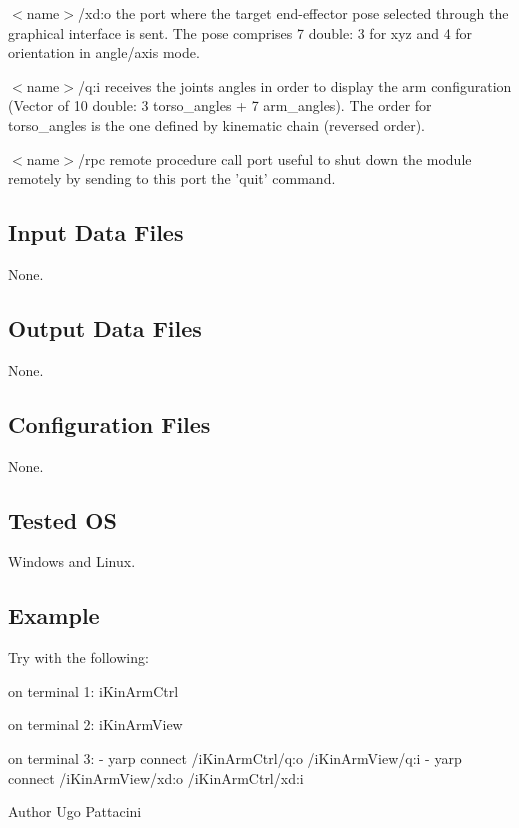 \begin{DoxyItemize}
\item {\itshape } $<$name$>$/xd\+:o the port where the target end-\/effector pose selected through the graphical interface is sent. The pose comprises 7 double\+: 3 for xyz and 4 for orientation in angle/axis mode.
\item {\itshape } $<$name$>$/q\+:i receives the joints angles in order to display the arm configuration (Vector of 10 double\+: 3 torso\+\_\+angles + 7 arm\+\_\+angles). The order for torso\+\_\+angles is the one defined by kinematic chain (reversed order).
\item {\itshape } $<$name$>$/rpc remote procedure call port useful to shut down the module remotely by sending to this port the 'quit' command.
\end{DoxyItemize}\hypertarget{group__signalScope_in_files_sec}{}\subsection{Input Data Files}\label{group__signalScope_in_files_sec}
None.\hypertarget{group__signalScope_out_data_sec}{}\subsection{Output Data Files}\label{group__signalScope_out_data_sec}
None.\hypertarget{group__signalScope_conf_file_sec}{}\subsection{Configuration Files}\label{group__signalScope_conf_file_sec}
None.\hypertarget{group__icub__tld_tested_os_sec}{}\subsection{Tested O\+S}\label{group__icub__tld_tested_os_sec}
Windows and Linux.\hypertarget{group__signalScope_example_sec}{}\subsection{Example}\label{group__signalScope_example_sec}
Try with the following\+:


\begin{DoxyCode}
on terminal 1: iKinArmCtrl 
 
on terminal 2: iKinArmView 
 
on terminal 3: 
- yarp connect /iKinArmCtrl/q:o  /iKinArmView/q:i 
- yarp connect /iKinArmView/xd:o /iKinArmCtrl/xd:i 
\end{DoxyCode}


\begin{DoxyAuthor}{Author}
Ugo Pattacini 
\end{DoxyAuthor}
